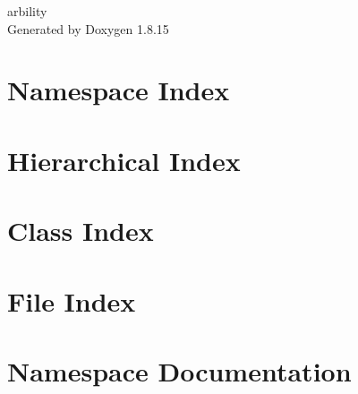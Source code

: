 \let\mypdfximage\pdfximage\def\pdfximage{\immediate\mypdfximage}\documentclass[twoside]{book}
\newcommand{\+}{\discretionary{\mbox{\scriptsize$\hookleftarrow$}}{}{}}
\newcommand{\clearemptydoublepage}{%
  \newpage{\pagestyle{empty}\cleardoublepage}%
}
\begin{document}
\hypersetup{pageanchor=false,
             bookmarksnumbered=true,
             pdfencoding=unicode
            }
\begin{titlepage}
\vspace*{7cm}
\begin{center}%
{\Large arbility }\\
\vspace*{1cm}
{\large Generated by Doxygen 1.8.15}\\
\end{center}
\end{titlepage}
\clearemptydoublepage
{}
\tableofcontents
\clearemptydoublepage
{}
\hypersetup{pageanchor=true}

\chapter{Namespace Index}

\chapter{Hierarchical Index}

\chapter{Class Index}

\chapter{File Index}

\chapter{Namespace Documentation}




\end{document}

